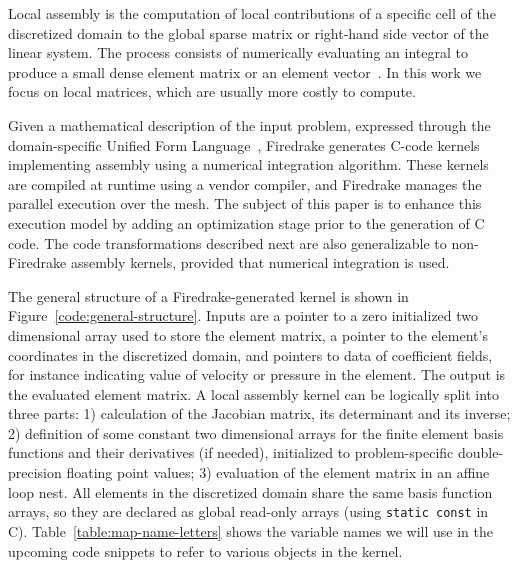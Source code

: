 \documentclass[conference]{IEEEtran}
\begin{document}

Local assembly is the computation of local contributions of a specific cell of the discretized domain to the global sparse matrix or right-hand side vector of the linear system. The process consists of numerically evaluating an integral to produce a small dense element matrix or an element vector~\cite{quadrature1, fluidity_manual_v4}. In this work we focus on local matrices, which are usually more costly to compute.


Given a mathematical description of the input problem, expressed through the domain-specific Unified Form Language~\cite{ufl}, Firedrake generates C-code kernels implementing assembly using a numerical integration algorithm. These kernels are compiled at runtime using a vendor compiler, and Firedrake manages the parallel execution over the mesh. The subject of this paper is to enhance this execution model by adding an optimization stage prior to the generation of C code. The code transformations described next are also generalizable to non-Firedrake assembly kernels, provided that numerical integration is used.

The general structure of a Firedrake-generated kernel is shown in Figure~\ref{code:general-structure}. Inputs are a pointer to a zero initialized two dimensional array used to store the element matrix, a pointer to the element's coordinates in the discretized domain, and pointers to data of coefficient fields, for instance indicating value of velocity or pressure in the element. The output is the evaluated element matrix. A local assembly kernel can be logically split into three parts: 1) calculation of the Jacobian matrix, its determinant and its inverse; 2) definition of some constant two dimensional arrays for the finite element basis functions and their derivatives (if needed), initialized to problem-specific double-precision floating point values; 3) evaluation of the element matrix in an affine loop nest. All elements in the discretized domain share the same basis function arrays, so they are declared as global read-only arrays (using \texttt{static const} in C). Table~\ref{table:map-name-letters} shows the variable names we will use in the upcoming code snippets to refer to various objects in the kernel.
\end{document}
